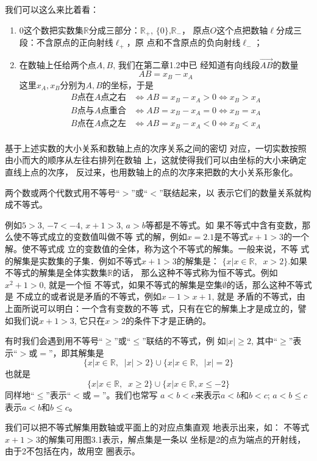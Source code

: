 我们可以这么来比着看：
\begin{enumerate}
    \item 0这个数把实数集$\mathbb{R}$分成三部分：$\mathbb{R}_+$, $\{0\}$,$\mathbb{R}_-$，
原点$O$这个点把数轴$\ell$分成三段：不含原点的正向射线$\ell_+$，原
点和不含原点的负向射线$\ell_-$；
\item 在数轴上任给两个点$A,B$, 我们在第二章1.2中已
经知道有向线段$\Vec{AB}$的数量
\[AB=x_B-x_A\]
这里$x_A,x_B$分别为$A,B$的坐标，于是
\[\begin{split}
    \text{$B$点在$A$点之右}&\Longleftrightarrow AB=x_B-x_A>0\Longleftrightarrow x_B>x_A\\
    \text{$B$点与$A$点重合}&\Longleftrightarrow AB=x_B-x_A=0\Longleftrightarrow x_B=x_A\\
    \text{$B$点在$A$点之左}&\Longleftrightarrow AB=x_B-x_A<0\Longleftrightarrow x_B<x_A\\
\end{split}\]
\end{enumerate}

基于上述实数的大小关系和数轴上点的次序关系之间的密切
对应，一切实数按照由小而大的顺序从左往右排列在数轴
上，这就使得我们可以由坐标的大小来确定直线上点的次序，
反过来，也用数轴上的点的次序来把数的大小关系形象化。

两个数或两个代数式用不等号“$>$”或“$<$”联结起来，以
表示它们的数量关系就构成不等式。

例如$5>3$, $-7<-4$, $x+1>3$, $a>b$等都是不等式。如
果不等式中含有变数，那么使不等式成立的变数值叫做不等
式的解，例如$x=2.1$是不等式$x+1>3$的一个解。使不等式成
立的变数值的全体，称为这个不等式的解集。一般来说，不等
式的解集是实数集的子集．例如不等式$x+1>3$的解集是：
$\{x|x\in\mathbb{R},\;\;x>2\}$.如果不等式的解集是全体实数集$\mathbb{R}$的话，
那么这种不等式称为恒不等式。例如$x^2+1>0$, 就是一个恒
不等式，如果不等式的解集是空集$\emptyset$的话，那么这种不等式是
不成立的或者说是矛盾的不等式，例如$x-1>x+1$, 就是
矛盾的不等式，由上面所说可以明白：一个含有变数的不等
式，只有在它的解集上才是成立的，譬如我们说$x+1>3$,
它只在$x>2$的条件下才是正确的。

有时我们会遇到用不等号“$\ge$”或“$\le$”联结的不等式，例
如$|x|\ge 2$, 其中“$\ge$”表示“$>$或$=$”，即其解集是
$$\{x|x\in\mathbb{R},\;\;|x|>2\}\cup\{x|x\in\mathbb{R},\;\;|x|=2\}$$
也就是$$\{x|x\in\mathbb{R},\;\;x\ge2\}\cup
\{x|x\in\mathbb{R},x\le -2\}$$
同样地“$\le$”表示“$<$或$=$”。我们也常写
$a<b<c$来表示$a<b$和$b<c$; $a<b\le c$表示$a<b$和$b\le c$。

我们可以把不等式解集用数轴或平面上的对应点集直观
地表示出来，如：
不等式$x+1>3$的解集可用图3.1表示，解点集是一条以
坐标是2的点为端点的开射线，由于2不包括在内，故用空
圈表示。

